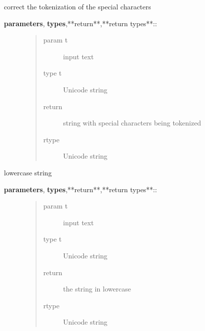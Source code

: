 \documentclass[letterpaper,10pt,english]{sphinxmanual}
\begin{document}
\begin{fulllineitems}
\begin{fulllineitems}
\begin{description}
\end{description}

\end{fulllineitems}


\begin{fulllineitems}
\label{API:norm.prepro.rewrite.Rewrite.tokenize_placeholders}
correct the tokenization of the special characters
\begin{description}
\item[{\textbf{parameters}, \textbf{types},**return**,**return types**::}] \leavevmode\begin{quote}\begin{description}
\item[{param t}] \leavevmode
input text

\item[{type t}] \leavevmode
Unicode string

\item[{return}] \leavevmode
string with special characters being tokenized

\item[{rtype}] \leavevmode
Unicode string

\end{description}\end{quote}

\end{description}

\end{fulllineitems}


\begin{fulllineitems}
\label{API:norm.prepro.rewrite.Rewrite.tolower}
lowercase string
\begin{description}
\item[{\textbf{parameters}, \textbf{types},**return**,**return types**::}] \leavevmode\begin{quote}\begin{description}
\item[{param t}] \leavevmode
input text

\item[{type t}] \leavevmode
Unicode string

\item[{return}] \leavevmode
the string in lowercase

\item[{rtype}] \leavevmode
Unicode string

\end{description}\end{quote}

\end{description}

\end{fulllineitems}


\end{fulllineitems}
\end{document}
